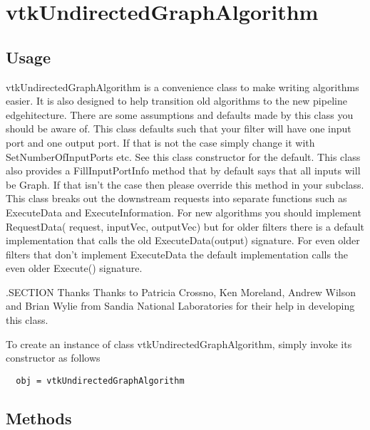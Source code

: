 \section{vtkUndirectedGraphAlgorithm}

\subsection{Usage}

 vtkUndirectedGraphAlgorithm is a convenience class to make writing algorithms
 easier. It is also designed to help transition old algorithms to the new
 pipeline edgehitecture. There are some assumptions and defaults made by this
 class you should be aware of. This class defaults such that your filter
 will have one input port and one output port. If that is not the case
 simply change it with SetNumberOfInputPorts etc. See this class
 constructor for the default. This class also provides a FillInputPortInfo
 method that by default says that all inputs will be Graph. If that
 isn't the case then please override this method in your subclass. This
 class breaks out the downstream requests into separate functions such as
 ExecuteData and ExecuteInformation.  For new algorithms you should
 implement RequestData( request, inputVec, outputVec) but for older filters
 there is a default implementation that calls the old ExecuteData(output)
 signature. For even older filters that don't implement ExecuteData the
 default implementation calls the even older Execute() signature.

 .SECTION Thanks
 Thanks to Patricia Crossno, Ken Moreland, Andrew Wilson and Brian Wylie from
 Sandia National Laboratories for their help in developing this class.

To create an instance of class vtkUndirectedGraphAlgorithm, simply
invoke its constructor as follows
\begin{verbatim}
  obj = vtkUndirectedGraphAlgorithm
\end{verbatim}
\subsection{Methods}

